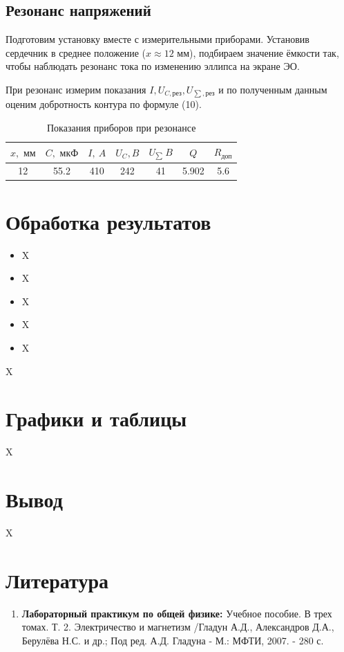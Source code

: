 \documentclass[a4paper, 12pt]{article}%
\begin{document}
\subsection{Резонанс напряжений}

Подготовим установку вместе с измерительными приборами. Установив сердечник в среднее положение ($x \approx 12 \text{ мм}$), подбираем значение ёмкости так, чтобы наблюдать резонанс тока по изменению эллипса на экране ЭО.

При резонанс измерим показания $I, U_{C,\text{рез}}, U_{\sum,\text{рез}}$ и по полученным данным оценим добротность контура по формуле (10).

\begin{table}[!h]
\begin{center}
\begin{tabular}{|c|c|c|c|c|c|c|}
\hline 
$x,\text{ мм}$ & $C,\text{ мкФ}$ & $I,\ A$ & $U_C, B$ & $U_{\sum}\ B$ & $Q$ & $R_{\text{доп}}$ \\ 
\hline 
12 & 55.2 & 410 & 242 & 41 & 5.902 & 5.6 \\ 
\hline 
\end{tabular}
\caption{Показания приборов при резонансе}
\end{center} 
\end{table}


\section{Обработка результатов}

\begin{itemize}

\item X

\item X

\item X

\item X

\item X

\end{itemize}

X

\section{Графики и таблицы}

X

\section{Вывод}

X

\section{Литература}

\begin{enumerate}
\item \textbf{Лабораторный практикум по общей физике:} Учебное пособие. В трех томах. Т. 2. Электричество и магнетизм /Гладун А.Д., Александров Д.А., Берулёва Н.С. и др.; Под ред. А.Д. Гладуна - М.: МФТИ, 2007. - 280 с.
\end{enumerate}		
		
					
\end{document}
